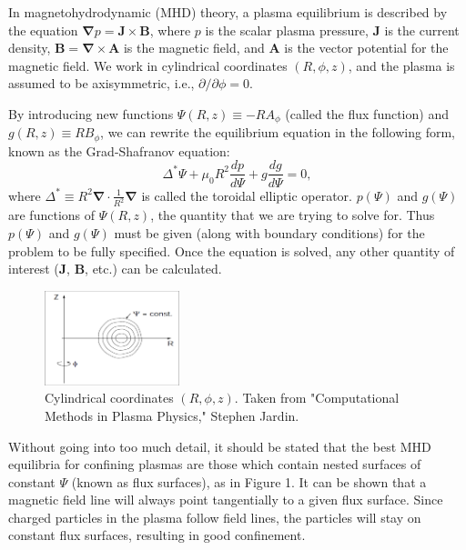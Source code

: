 \documentclass[paper=letter, fontsize=11pt]{scrartcl} %
\begin{document}
In magnetohydrodynamic (MHD) theory, a plasma equilibrium is described by the equation $\mathbf{\nabla} p = \mathbf{J} \times \mathbf{B}$, where $p$ is the scalar plasma pressure, $\mathbf{J}$ is the current density, $\mathbf{B} = \mathbf{\nabla} \times \mathbf{A}$ is the magnetic field, and $\mathbf{A}$ is the vector potential for the magnetic field.  We work in cylindrical coordinates $(R, \phi, z)$, and the plasma is assumed to be axisymmetric, i.e., $\partial / \partial \phi = 0$.

By introducing new functions $\Psi(R,z) \equiv -R A_{\phi}$ (called the flux function) and $g(R,z) \equiv R B_{\phi}$, we can rewrite the equilibrium equation in the following form, known as the Grad-Shafranov equation:
\begin{equation}
\Delta^{*} \Psi + \mu_0 R^2 \frac{dp}{d\Psi} + g \frac{dg}{d\Psi} = 0,
\end{equation}
where $\Delta^{*} \equiv R^2 \mathbf{\nabla} \cdot \frac{1}{R^2} \mathbf{\nabla}$ is called the toroidal elliptic operator. $p(\Psi)$ and $g(\Psi)$ are functions of $\Psi(R,z)$, the quantity that we are trying to solve for.  Thus $p(\Psi)$ and $g(\Psi)$ must be given (along with boundary conditions) for the problem to be fully specified.  Once the equation is solved, any other quantity of interest ($\mathbf{J}$, $\mathbf{B}$, etc.) can be calculated.  

\begin{figure}
\centering
\captionsetup{justification=centering,margin=3cm}
\caption[caption]{Cylindrical coordinates $(R,\phi,z)$.  Taken from "Computational Methods in Plasma Physics," Stephen Jardin.}

\includegraphics[width=0.35\textwidth]{coordinates}

\end{figure}

Without going into too much detail, it should be stated that the best MHD equilibria for confining plasmas are those which contain nested surfaces of constant $\Psi$ (known as flux surfaces), as in Figure 1.  It can be shown that a magnetic field line will always point tangentially to a given flux surface.  Since charged particles in the plasma follow field lines, the particles will stay on constant flux surfaces, resulting in good confinement. 
\end{document}
